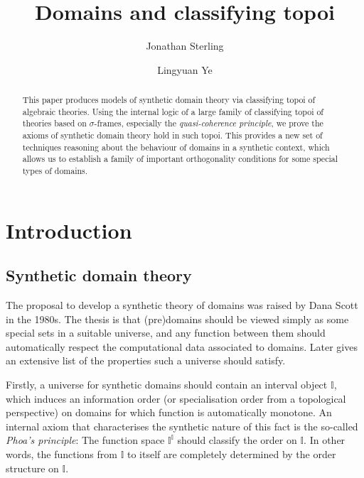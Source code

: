 \documentclass[12pt]{amsart}
\title{Domains and classifying topoi}
\author{Jonathan Sterling}
\author{Lingyuan Ye}
\theoremstyle{definition}
\newcommand{\mbb}[1]{\mathbb{#1}}
\newcommand{\I}{\mbb I}
\begin{document}
%

%
%

%
%
\begin{abstract}
  This paper produces models of synthetic domain theory via classifying topoi of algebraic theories. Using the internal logic of a large family of classifying topoi of theories based on $\sigma$-frames, especially the \emph{quasi-coherence principle}, we prove the axioms of synthetic domain theory hold in such topoi. This provides a new set of techniques reasoning about the behaviour of domains in a synthetic context, which allows us to establish a family of important orthogonality conditions for some special types of domains.
\end{abstract}
%
\maketitle              %
%

\section{Introduction}\label{sec:intro}

\subsection{Synthetic domain theory}\label{subsec:sdt}

The proposal to develop a synthetic theory of domains was raised by Dana Scott in the 1980s. The thesis is that (pre)domains should be viewed simply as some special sets in a suitable universe, and any function between them should automatically respect the computational data associated to domains. Later \citet{hyland1990first} gives an extensive list of the properties such a universe should satisfy.

Firstly, a universe for synthetic domains should contain an interval object $\I$, which induces an information order (or specialisation order from a topological perspective) on domains for which function is automatically monotone. An internal axiom that characterises the synthetic nature of this fact is the so-called \emph{Phoa's principle}: The function space $\I^\I$ should classify the order on $\I$. In other words, the functions from $\I$ to itself are completely determined by the order structure on $\I$. 
\end{document}
